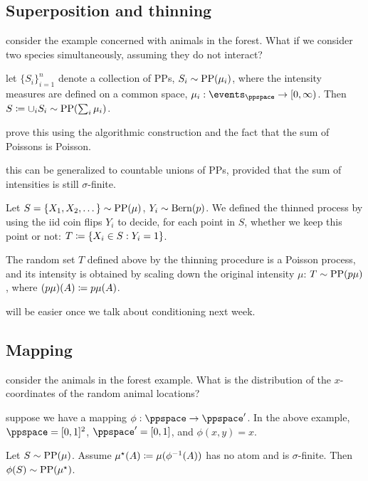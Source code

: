 \documentclass{article}
\begin{document}
\subsection{Superposition and thinning}

 consider the example concerned with animals in the forest. What if we consider two species simultaneously, assuming they do not interact?

 let $\{S_i\}_{i = 1}^n$ denote a collection of PPs, $S_i \sim \operatorname{PP}(\mu_i)$, where the intensity measures are defined on a common space, $\mu_i : \events_{\ppspace} \to [0, \infty)$. Then $S \coloneqq \cup_i S_i \sim \operatorname{PP}(\sum_i \mu_i)$.

 prove this using the algorithmic construction and the fact that the sum of Poissons is Poisson. 

 this can be generalized to countable unions of PPs, provided that the sum of intensities is still $\sigma$-finite.

 Let $S = \{X_1, X_2, \dots\} \sim \operatorname{PP}(\mu)$, $Y_i \sim \operatorname{Bern}(p)$. We defined the thinned process by using the iid coin flips $Y_i$ to decide, for each point in $S$, whether we keep this point or not: $T \coloneqq \{X_i \in S : Y_i = 1\}$.

 The random set $T$ defined above by the thinning procedure is a Poisson process, and its intensity is obtained by scaling down the original intensity $\mu$: $T \sim \operatorname{PP}(p\mu)$, where $(p\mu)(A) \coloneqq p \mu(A)$.

 will be easier once we talk about conditioning next week. 


\subsection{Mapping}

 consider the animals in the forest example. What is the distribution of the $x$-coordinates of the random animal locations?

 suppose we have a mapping $\phi : \ppspace \to \ppspace'$. In the above example, $\ppspace = [0,1]^2$, $\ppspace' = [0,1]$, and $\phi(x, y) = x$.

 Let $S \sim \operatorname{PP}(\mu)$. Assume $\mu^\star(A) \coloneqq \mu(\phi^{-1}(A))$ has no atom and is $\sigma$-finite. Then $\phi(S) \sim \operatorname{PP}(\mu^\star)$.
\end{document}
